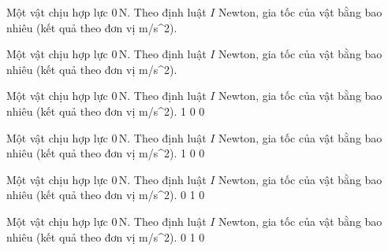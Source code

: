 \begin{bt}
Một vật chịu hợp lực $0\,\text{N}$. Theo định luật $I$ Newton, gia tốc của vật bằng bao nhiêu (kết quả theo đơn vị m/s^2).
\end{bt}

\begin{bt}
Một vật chịu hợp lực $0\,\text{N}$. Theo định luật $I$ Newton, gia tốc của vật bằng bao nhiêu (kết quả theo đơn vị m/s^2).
\end{bt}

\begin{ex}
Một vật chịu hợp lực $0\,\text{N}$. Theo định luật $I$ Newton, gia tốc của vật bằng bao nhiêu (kết quả theo đơn vị m/s^2).
\choice
{}
{1}
{0}
{0}
\end{ex}

\begin{ex}
Một vật chịu hợp lực $0\,\text{N}$. Theo định luật $I$ Newton, gia tốc của vật bằng bao nhiêu (kết quả theo đơn vị m/s^2).
\choice
{1}
{}
{0}
{0}
\end{ex}

\begin{ex}
Một vật chịu hợp lực $0\,\text{N}$. Theo định luật $I$ Newton, gia tốc của vật bằng bao nhiêu (kết quả theo đơn vị m/s^2).
\choice
{0}
{1}
{}
{0}
\end{ex}

\begin{ex}
Một vật chịu hợp lực $0\,\text{N}$. Theo định luật $I$ Newton, gia tốc của vật bằng bao nhiêu (kết quả theo đơn vị m/s^2).
\choice
{0}
{1}
{0}
{}
\end{ex}

